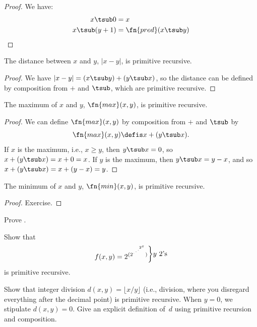 \documentclass[../../../include/open-logic-section]{subfiles}
\begin{document}
\begin{proof}
  We have:
  \begin{align*}
    x \tsub 0 & = x\\
    x \tsub (y+1) & = \fn{pred}(x \tsub y) 
  \end{align*}
\end{proof}

\begin{prop}
 The distance between $x$ and $y$, $\left|x-y\right|$, is primitive recursive.
\end{prop}

\begin{proof}
  We have $\left| x-y \right| = (x \tsub y) + (y \tsub x)$, so
  the distance can be defined by composition from $+$ and $\tsub$,
  which are primitive recursive.
\end{proof}

\begin{prop}
  The maximum of $x$ and $y$, $\fn{max}(x,y)$, is primitive recursive.
\end{prop}

\begin{proof}
  We can define $\fn{max}(x,y)$ by composition from $+$ and $\tsub$ by
  \[
  \fn{max}(x,y) \defis x + (y \tsub x).
  \]
  If $x$ is the maximum, i.e., $x \ge y$, then $y \tsub x = 0$, so $x
  + (y \tsub x) = x + 0 = x$. If $y$ is the maximum, then $y \tsub x =
  y - x$, and so $x + (y \tsub x) = x + (y - x) = y$.
\end{proof}

\begin{prop}
  The minimum of $x$ and $y$, $\fn{min}(x,y)$, is primitive recursive.
\end{prop}

\begin{proof}
  Exercise.
\end{proof}

\begin{prob}
  Prove .
\end{prob}

\begin{prob}
Show that \[
f(x, y) =
2^{(2^{\iddots^{2^{x}}})}\raisebox{1ex}{\bigg\rbrace}
\raisebox{1ex}{\text {$y$ $2$'s}}\] is primitive recursive.
\end{prob}

\begin{prob}
Show that integer division $d(x, y) = \lfloor x/y \rfloor$ (i.e.,
division, where you disregard everything after the decimal point) is
primitive recursive. When $y = 0$, we stipulate $d(x, y) = 0$. Give an
explicit definition of~$d$ using primitive recursion and
composition.
\end{prob}
\end{document}
